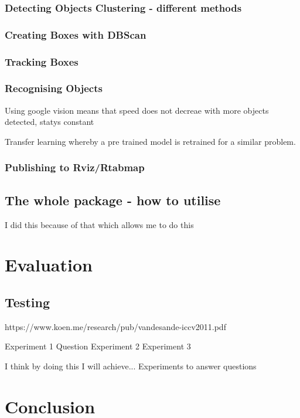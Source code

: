 \documentclass{mproj}
\begin{document}
\subsection{Detecting Objects Clustering - different methods}
\subsection{Creating Boxes with DBScan}
\subsection{Tracking Boxes}
\subsection{Recognising Objects}

Using google vision means that speed does not decreae with more objects detected, statys constant


Transfer learning whereby a pre trained model is retrained for a similar problem.
\subsection{Publishing to Rviz/Rtabmap}
\section{The whole package - how to utilise}

I did this because of that which allows me to do this

\chapter{Evaluation}
\section{Testing}
https://www.koen.me/research/pub/vandesande-iccv2011.pdf

Experiment 1
Question
Experiment 2
Experiment 3


I think by doing this I will achieve...
Experiments to answer questions

\chapter{Conclusion}\label{conclusion}
\end{document}
